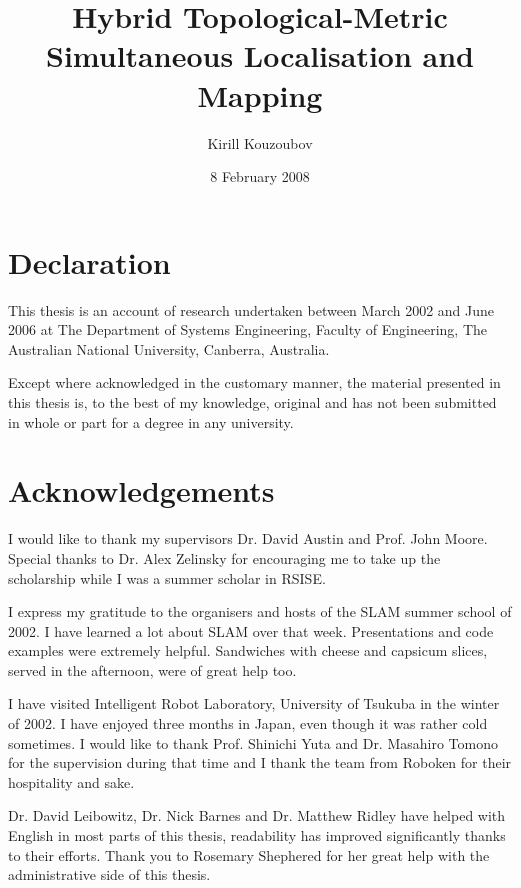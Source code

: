 \documentclass[11pt,onecolum,a4paper,oneside]{book}
\title{Hybrid Topological-Metric Simultaneous Localisation and
  Mapping}
\author{Kirill Kouzoubov}
\begin{document}
\date{8 February 2008}

\maketitle
\normalsize

\onehalfspace
\chapter*{Declaration}

This thesis is an account of research undertaken between March 2002
and June 2006 at The Department of Systems Engineering, Faculty of
Engineering, The Australian National University, Canberra, Australia.

Except where acknowledged in the customary manner, the material 
presented in this thesis is, to the best of my knowledge, original and 
has not been submitted in whole or part for a degree in any 
university.

\chapter*{Acknowledgements}

I would like to thank my supervisors Dr. David Austin and Prof. John
Moore. Special thanks to Dr. Alex Zelinsky for encouraging me to take
up the scholarship while I was a summer scholar in RSISE.

I express my gratitude to the organisers and hosts of the SLAM summer
school of 2002. I have learned a lot about SLAM over that week.
Presentations and code examples were extremely helpful.  Sandwiches
with cheese and capsicum slices, served in the afternoon, were of
great help too.

I have visited Intelligent Robot Laboratory, University of Tsukuba in
the winter of 2002. I have enjoyed three months in Japan, even though
it was rather cold sometimes. I would like to thank Prof. Shinichi
Yuta and Dr. Masahiro Tomono for the supervision during that time and
I thank the team from Roboken for their hospitality and sake.

Dr. David Leibowitz, Dr. Nick Barnes and Dr. Matthew Ridley have helped
with English in most parts of this thesis, readability has improved
significantly thanks to their efforts. Thank you to Rosemary Shephered
for her great help with the administrative side of this thesis.

\end{document}
